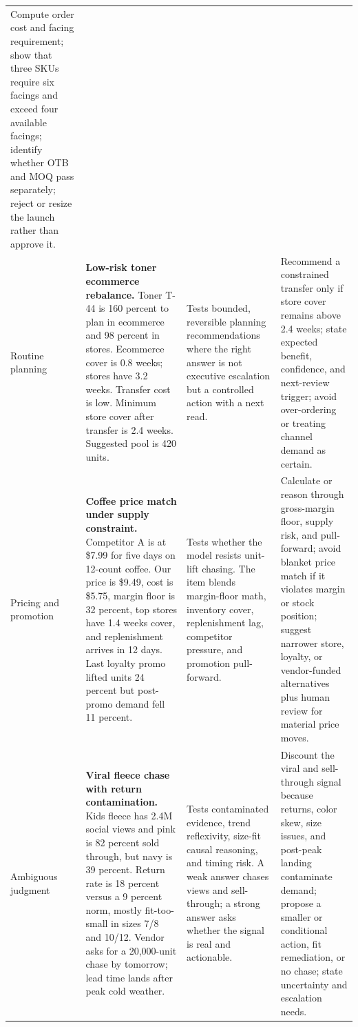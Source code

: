 \documentclass[11pt]{article}
\begin{document}
\begin{longtable}{>{\raggedright\arraybackslash}p{} >{\raggedright\arraybackslash}p{} >{\raggedright\arraybackslash}p{} >{\raggedright\arraybackslash}p{}}
Compute order cost and facing requirement; show that three SKUs require six facings and exceed four available facings; identify whether OTB and MOQ pass separately; reject or resize the launch rather than approve it. \\
\addlinespace
Routine planning &
\textbf{Low-risk toner ecommerce rebalance.} Toner T-44 is 160 percent to plan in ecommerce and 98 percent in stores. Ecommerce cover is 0.8 weeks; stores have 3.2 weeks. Transfer cost is low. Minimum store cover after transfer is 2.4 weeks. Suggested pool is 420 units. &
Tests bounded, reversible planning recommendations where the right answer is not executive escalation but a controlled action with a next read. &
Recommend a constrained transfer only if store cover remains above 2.4 weeks; state expected benefit, confidence, and next-review trigger; avoid over-ordering or treating channel demand as certain. \\
\addlinespace
Pricing and promotion &
\textbf{Coffee price match under supply constraint.} Competitor A is at \$7.99 for five days on 12-count coffee. Our price is \$9.49, cost is \$5.75, margin floor is 32 percent, top stores have 1.4 weeks cover, and replenishment arrives in 12 days. Last loyalty promo lifted units 24 percent but post-promo demand fell 11 percent. &
Tests whether the model resists unit-lift chasing. The item blends margin-floor math, inventory cover, replenishment lag, competitor pressure, and promotion pull-forward. &
Calculate or reason through gross-margin floor, supply risk, and pull-forward; avoid blanket price match if it violates margin or stock position; suggest narrower store, loyalty, or vendor-funded alternatives plus human review for material price moves. \\
\addlinespace
Ambiguous judgment &
\textbf{Viral fleece chase with return contamination.} Kids fleece has 2.4M social views and pink is 82 percent sold through, but navy is 39 percent. Return rate is 18 percent versus a 9 percent norm, mostly fit-too-small in sizes 7/8 and 10/12. Vendor asks for a 20,000-unit chase by tomorrow; lead time lands after peak cold weather. &
Tests contaminated evidence, trend reflexivity, size-fit causal reasoning, and timing risk. A weak answer chases views and sell-through; a strong answer asks whether the signal is real and actionable. &
Discount the viral and sell-through signal because returns, color skew, size issues, and post-peak landing contaminate demand; propose a smaller or conditional action, fit remediation, or no chase; state uncertainty and escalation needs. \\

\end{longtable}
\end{document}
